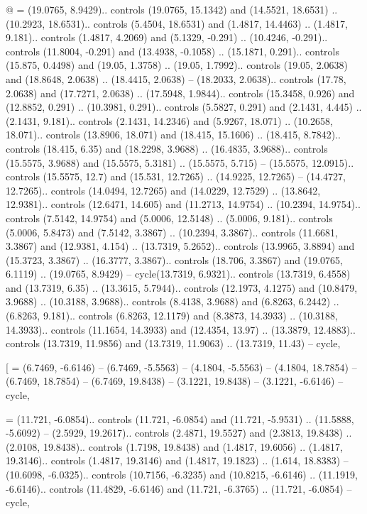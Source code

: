 @ = {(19.0765, 8.9429).. controls (19.0765, 15.1342) and (14.5521, 18.6531) .. (10.2923, 18.6531).. controls (5.4504, 18.6531) and (1.4817, 14.4463) .. (1.4817, 9.181).. controls (1.4817, 4.2069) and (5.1329, -0.291) .. (10.4246, -0.291).. controls (11.8004, -0.291) and (13.4938, -0.1058) .. (15.1871, 0.291).. controls (15.875, 0.4498) and (19.05, 1.3758) .. (19.05, 1.7992).. controls (19.05, 2.0638) and (18.8648, 2.0638) .. (18.4415, 2.0638) -- (18.2033, 2.0638).. controls (17.78, 2.0638) and (17.7271, 2.0638) .. (17.5948, 1.9844).. controls (15.3458, 0.926) and (12.8852, 0.291) .. (10.3981, 0.291).. controls (5.5827, 0.291) and (2.1431, 4.445) .. (2.1431, 9.181).. controls (2.1431, 14.2346) and (5.9267, 18.071) .. (10.2658, 18.071).. controls (13.8906, 18.071) and (18.415, 15.1606) .. (18.415, 8.7842).. controls (18.415, 6.35) and (18.2298, 3.9688) .. (16.4835, 3.9688).. controls (15.5575, 3.9688) and (15.5575, 5.3181) .. (15.5575, 5.715) -- (15.5575, 12.0915).. controls (15.5575, 12.7) and (15.531, 12.7265) .. (14.9225, 12.7265) -- (14.4727, 12.7265).. controls (14.0494, 12.7265) and (14.0229, 12.7529) .. (13.8642, 12.9381).. controls (12.6471, 14.605) and (11.2713, 14.9754) .. (10.2394, 14.9754).. controls (7.5142, 14.9754) and (5.0006, 12.5148) .. (5.0006, 9.181).. controls (5.0006, 5.8473) and (7.5142, 3.3867) .. (10.2394, 3.3867).. controls (11.6681, 3.3867) and (12.9381, 4.154) .. (13.7319, 5.2652).. controls (13.9965, 3.8894) and (15.3723, 3.3867) .. (16.3777, 3.3867).. controls (18.706, 3.3867) and (19.0765, 6.1119) .. (19.0765, 8.9429) -- cycle(13.7319, 6.9321).. controls (13.7319, 6.4558) and (13.7319, 6.35) .. (13.3615, 5.7944).. controls (12.1973, 4.1275) and (10.8479, 3.9688) .. (10.3188, 3.9688).. controls (8.4138, 3.9688) and (6.8263, 6.2442) .. (6.8263, 9.181).. controls (6.8263, 12.1179) and (8.3873, 14.3933) .. (10.3188, 14.3933).. controls (11.1654, 14.3933) and (12.4354, 13.97) .. (13.3879, 12.4883).. controls (13.7319, 11.9856) and (13.7319, 11.9063) .. (13.7319, 11.43) -- cycle},

[ = {(6.7469, -6.6146) -- (6.7469, -5.5563) -- (4.1804, -5.5563) -- (4.1804, 18.7854) -- (6.7469, 18.7854) -- (6.7469, 19.8438) -- (3.1221, 19.8438) -- (3.1221, -6.6146) -- cycle},

\ctpbackslash = {(11.721, -6.0854).. controls (11.721, -6.0854) and (11.721, -5.9531) .. (11.5888, -5.6092) -- (2.5929, 19.2617).. controls (2.4871, 19.5527) and (2.3813, 19.8438) .. (2.0108, 19.8438).. controls (1.7198, 19.8438) and (1.4817, 19.6056) .. (1.4817, 19.3146).. controls (1.4817, 19.3146) and (1.4817, 19.1823) .. (1.614, 18.8383) -- (10.6098, -6.0325).. controls (10.7156, -6.3235) and (10.8215, -6.6146) .. (11.1919, -6.6146).. controls (11.4829, -6.6146) and (11.721, -6.3765) .. (11.721, -6.0854) -- cycle},

